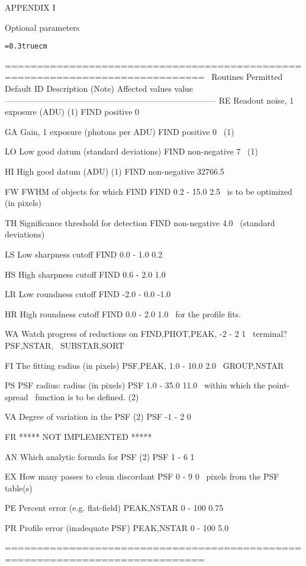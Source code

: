 \vfill
\eject
\centerline{APPENDIX I}
\bigskip
\centerline{Optional parameters}
\bigskip
{\noindent\obeylines\obeyspaces\frenchspacing\tt\baselineskip=0.3truecm

=============================================================================
\                                          Routines      Permitted     Default
ID        Description (Note)              Affected        values       value 
-----------------------------------------------------------------------------
RE  Readout noise, 1 exposure (ADU) (1)     FIND         positive        0

GA  Gain, 1 exposure (photons per ADU)      FIND         positive        0
\    (1)

LO  Low good datum (standard deviations)    FIND       non-negative      7
\    (1)

HI  High good datum (ADU) (1)               FIND       non-negative   32766.5

FW  FWHM of objects for which FIND          FIND        0.2 - 15.0      2.5 
\    is to be optimized (in pixels)                                      

TH  Significance threshold for detection    FIND       non-negative     4.0
\    (standard deviations)

LS  Low sharpness cutoff                    FIND         0.0 - 1.0      0.2  

HS  High sharpness cutoff                   FIND         0.6 - 2.0      1.0  

LR  Low roundness cutoff                    FIND        -2.0 - 0.0     -1.0  

HR  High roundness cutoff                   FIND         0.0 - 2.0      1.0  
\    for the profile fits.   

WA  Watch progress of reductions on    FIND,PHOT,PEAK,    -2 - 2         1
\    terminal?                            PSF,NSTAR,
\                                        SUBSTAR,SORT

FI  The fitting radius (in pixels)        PSF,PEAK,      1.0 - 10.0     2.0 
\                                         GROUP,NSTAR
  
PS  PSF radius: radius (in pixels)          PSF          1.0 - 35.0    11.0 
\    within which the point-spread      
\    function is to be defined. (2)                                       

VA  Degree of variation in the PSF (2)      PSF           -1 - 2         0

FR                         ***** NOT IMPLEMENTED *****

AN  Which analytic formula for PSF (2)      PSF            1 - 6         1

EX  How many passes to clean discordant     PSF            0 - 9         0
\    pixels from the PSF table(s)

PE  Percent error (e.g. flat-field)      PEAK,NSTAR       0 - 100       0.75

PR  Profile error (inadequate PSF)       PEAK,NSTAR       0 - 100       5.0

=============================================================================

}

